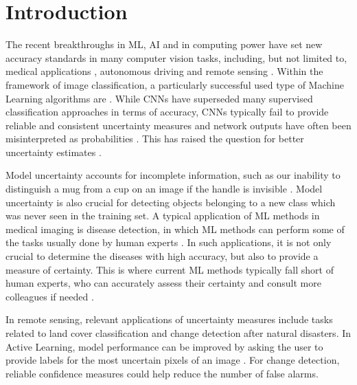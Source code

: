 \documentclass[10pt]{article}
\begin{document}
\section{Introduction}
The recent breakthroughs in \gls{ML}, \gls{AI} and in computing power have set new accuracy standards in many computer vision tasks, including, but not limited to, medical applications \cite{leibig2017, ronneberger2015u}, autonomous driving \cite{Levinson2011TowardsFA} and remote sensing \cite{Volpi2017DenseSL, kampffmeyer, Zhu2017DeepLI, Shelhamer2015FullyCN}. Within the framework of image classification, a particularly successful used type of Machine Learning algorithms are . While \glspl{CNN} have superseded many supervised classification approaches in terms of accuracy, \glspl{CNN} typically fail to provide reliable and consistent uncertainty measures and network outputs have often been misinterpreted as probabilities \cite{NguyenYC14, Goodfellow2014}. This has raised the question for better uncertainty estimates \cite{KendallG17, Gal2016Uncertainty}.

Model uncertainty accounts for incomplete information, such as our inability to distinguish a mug from a cup on an image if the handle is invisible \cite{Rupprecht2017LearningIA}. Model uncertainty is also crucial for detecting objects belonging to a new class which was never seen in the training set. A typical application of \gls{ML} methods in medical imaging is disease detection, in which \gls{ML} methods can perform some of the tasks usually done by human experts \cite{leibig2017}. In such applications, it is not only crucial to determine the diseases with high accuracy, but also to provide a measure of certainty. This is where current \gls{ML} methods typically fall short of human experts, who can accurately assess their certainty and consult more colleagues if needed \cite{leibig2017}.

In remote sensing, relevant applications of uncertainty measures include tasks related to land cover classification and change detection after natural disasters. In Active Learning, model performance can be improved by asking the user to provide labels for the most uncertain pixels of an image \cite{menderes_automatic_2015, womble_automated_2007, postadjian_investigating_2017, tuiaAL2011, Tuia2011ASO}. For change detection, reliable confidence measures could help reduce the number of false alarms.
\end{document}
